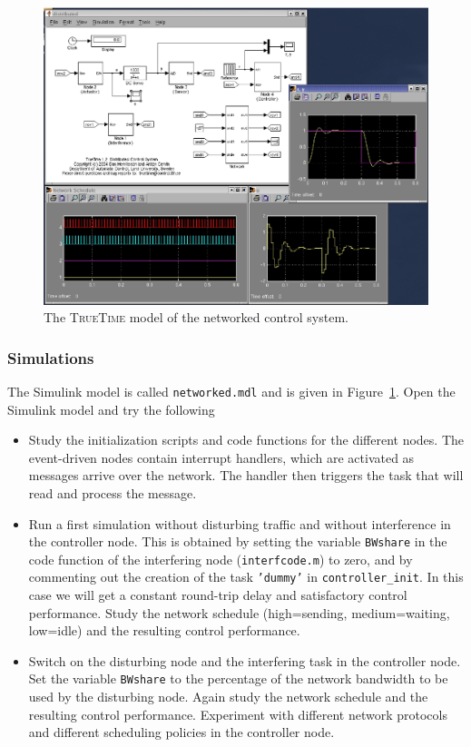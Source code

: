 \documentclass[final,twoside]{rapport}
\begin{document}
\begin{figure}[tbp]
  \begin{center}
    \includegraphics[scale=.6]{dist.ps}
  \end{center}
  \caption{The \textsc{TrueTime} model of the networked control system.}
  \label{fig:dist}
\end{figure}

\subsubsection{Simulations}
The Simulink model is called \texttt{networked.mdl} and is given in
Figure~\ref{fig:dist}. Open the Simulink model and try the following

\begin{itemize}
\item Study the initialization scripts and code functions for the
  different nodes. The event-driven nodes contain interrupt handlers,
  which are activated as messages arrive over the network. The handler
  then triggers the task that will read and process the message.
\item Run a first simulation without disturbing traffic and without
  interference in the controller node. This is obtained by setting the
  variable \texttt{BWshare} in the code function of the interfering
  node (\texttt{interfcode.m}) to zero, and by commenting out the
  creation of the task \texttt{'dummy'} in \texttt{controller\_init}.
  In this case we will get a constant round-trip delay and
  satisfactory control performance. Study the network schedule
  (high=sending, medium=waiting, low=idle) and the resulting control
  performance.
\item Switch on the disturbing node and the interfering task in the
  controller node. Set the variable \texttt{BWshare} to the percentage
  of the network bandwidth to be used by the disturbing node. Again
  study the network schedule and the resulting control performance.
  Experiment with different network protocols and different scheduling
  policies in the controller node.
\end{itemize} 
\end{document}
